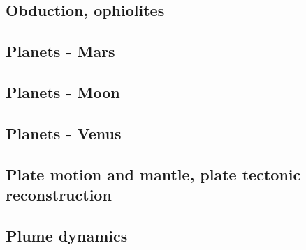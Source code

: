 \subsection*{Obduction, ophiolites}

\noindent
\cite{hack90}
\cite{hack91}
\cite{agzf14}

\subsection*{Planets - Mars}

\cite{scbg90}
\cite{nist01}
\cite{vavv05}
\cite{gokg11}
\cite{seki14}
\cite{zhon16}

\subsection*{Planets - Moon}

\cite{zhdv19}

\subsection*{Planets - Venus}

\cite{scbg90}
\cite{kiha92}
\cite{somo96}
\cite{mazk98}\cite{moso98}
\cite{vavv05}
\cite{arta12}
\cite{gita14}
\cite{gery14b}
\cite{cram17}\cite{dast17}
\cite{king18}



\subsection*{Plate motion and mantle, plate tectonic reconstruction}

\noindent
\cite{mcse73}
\cite{zieg92a}
\cite{zhgm98}
\cite{evan03}\cite{reta03}
\cite{lizh09}\cite{vasv09}
\cite{huss12}\cite{gutz12}
\cite{mosq13}
\cite{yoha15}
\cite{tewg19}

\subsection*{Plume dynamics}

